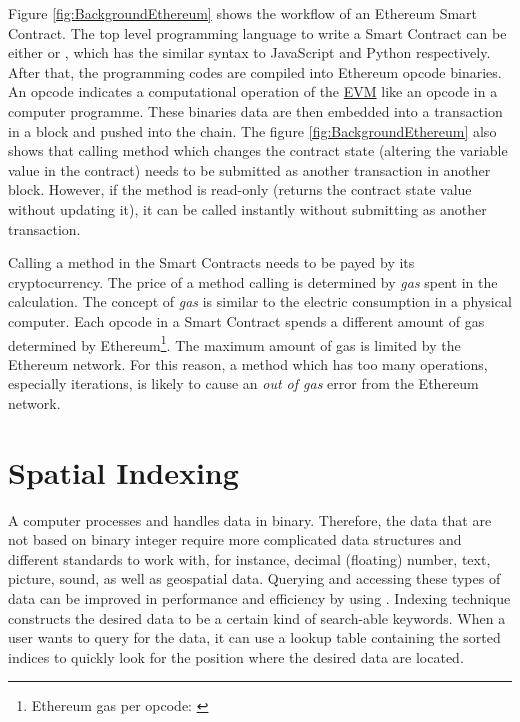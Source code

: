 \npara Figure \ref{fig:BackgroundEthereum} shows the workflow of an Ethereum Smart Contract.
The top level programming language to write a Smart Contract can be either  or , which has the similar syntax to JavaScript and Python respectively.
After that, the programming codes are compiled into Ethereum opcode binaries.
An opcode indicates a computational operation of the \hyperref[Acronym-EVM]{EVM} like an opcode in a computer programme.
These binaries data are then embedded into a transaction in a block and pushed into the chain.
The figure \ref{fig:BackgroundEthereum} also shows that calling method which changes the contract state (altering the variable value in the contract) needs to be submitted as another transaction in another block.
However, if the method is read-only (returns the contract state value without updating it), it can be called instantly without submitting as another transaction.

Calling a method in the Smart Contracts needs to be payed by its cryptocurrency.
The price of a method calling is determined by \textit{gas} spent in the calculation.
The concept of \textit{gas} is similar to the electric consumption in a physical computer.
Each opcode in a Smart Contract spends a different amount of gas determined by Ethereum\footnote{Ethereum gas per opcode: \hyperlink{https://docs.google.com/spreadsheets/d/1m89CVujrQe5LAFJ8-YAUCcNK950dUzMQPMJBxRtGCqs}{}}.
The maximum amount of gas is limited by the Ethereum network.
For this reason, a method which has too many operations, especially iterations, is likely to cause an \textit{out of gas} error from the Ethereum network.

\npara


\section{Spatial Indexing} \label{Background-SpatialIndexing}

\npara A computer processes and handles data in binary.
Therefore, the data that are not based on binary integer require more complicated data structures and different standards to work with, for instance, decimal (floating) number, text, picture, sound, as well as geospatial data.
Querying and accessing these types of data can be improved in performance and efficiency by using .
Indexing technique constructs the desired data to be a certain kind of search-able keywords.
When a user wants to query for the data, it can use a lookup table containing the sorted indices to quickly look for the position where the desired data are located.

